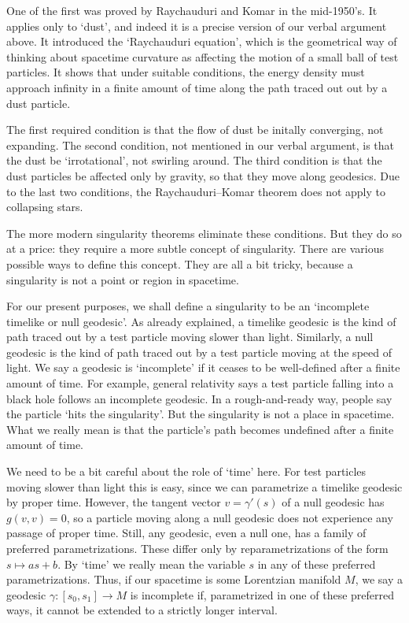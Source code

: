 \documentclass{article}
\newcommand{\maps}{\colon}
\begin{document}
One of the first was proved by Raychauduri \cite{Raychauduri} and Komar \cite{Komar}
in the mid-1950's.   It applies only to  `dust', and indeed it is a precise version of our verbal argument above.   It introduced the `Raychauduri equation', which is the geometrical way of thinking about spacetime curvature as affecting the motion of a small ball of test particles.   It shows that under suitable conditions, the energy density must approach infinity in a finite amount of time along the path traced out out by a dust particle.   

The first required condition is that the flow of dust be initally converging, not expanding.  The second condition, not mentioned in our verbal argument, is that the dust be `irrotational', not swirling around.     The third condition is that the dust particles be affected only by gravity, so that they move along geodesics.   Due to the last two conditions, the Raychauduri--Komar theorem does not apply to collapsing stars.

The more modern singularity theorems eliminate these conditions.  But they do so at a price: they require a more subtle concept of singularity.   There are various possible ways to define this concept.  They are all a bit tricky, because a singularity is not a point or region in spacetime.  

For our present purposes, we shall define a singularity to be an `incomplete timelike or null geodesic'.    As already explained, a timelike geodesic is the kind of path traced out by a test  particle moving slower than light.  Similarly, a null geodesic is the kind of path traced out by a test particle moving at the speed of light.   We say a geodesic is `incomplete' if it ceases to be well-defined after a finite amount of time.   For example, general relativity says a test particle falling into a black hole follows an incomplete geodesic.   In a rough-and-ready way, people say the particle `hits the singularity'.   But the singularity is not a place in spacetime.  What we really mean is that the particle's path becomes undefined after a finite amount of time.

We need to be a bit careful about the role of `time' here.  For test particles moving slower than light this is easy, since we can parametrize a timelike geodesic by proper time.  However, the tangent vector $v = \gamma'(s)$ of a null geodesic has $g(v,v) = 0$, so a particle moving along a null geodesic does not experience any passage of proper time.  Still, any geodesic, even a null one, has a family of preferred parametrizations.  These differ only by reparametrizations of the form $s \mapsto as + b$.   By `time' we really mean the variable $s$ in any of these preferred parametrizations.   Thus, if our spacetime is some Lorentzian manifold $M$, we say a geodesic $\gamma \maps [s_0, s_1] \to M$ is incomplete if, parametrized in one of these preferred ways, it cannot be extended to a strictly longer interval.  
\end{document}
